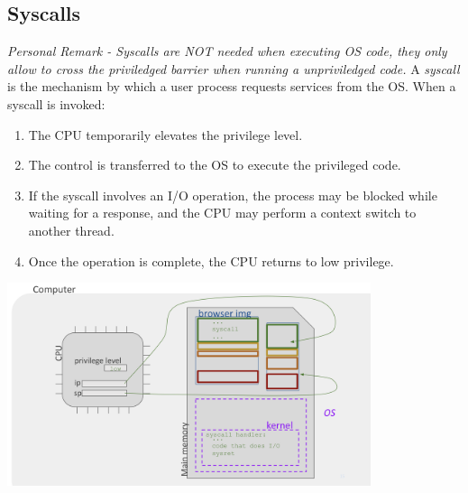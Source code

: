 \subsection{Syscalls}
\textit{Personal Remark - Syscalls are NOT needed when executing OS code, they only allow to cross the priviledged barrier when running a unpriviledged code.}
A \emph{syscall} is the mechanism by which a user process requests services from the OS. When a syscall is invoked:
\begin{enumerate}
  \item The CPU temporarily elevates the privilege level.
  \item The control is transferred to the OS to execute the privileged code.
  \item If the syscall involves an I/O operation, the process may be blocked while waiting for a response, and the CPU may perform a context switch to another thread.
  \item Once the operation is complete, the CPU returns to low privilege.
\end{enumerate}

\begin{center}
  \includegraphics[width=0.8\textwidth]{chapters/L3/images/parallel-syscall.png}
\end{center}
\newpage

